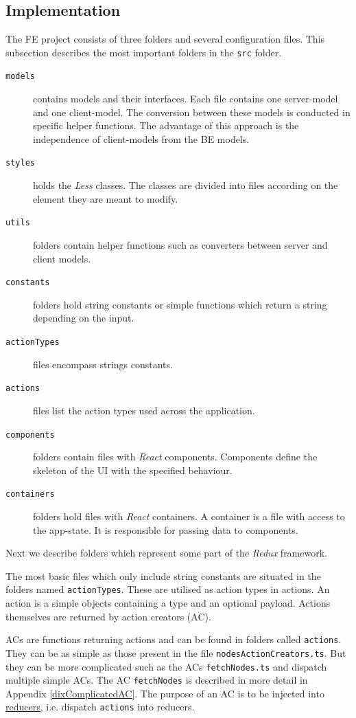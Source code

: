 \subsection{Implementation}
The FE project consists of three folders and several configuration files. This subsection describes the most important folders in the \texttt{src} folder. 
\begin{description}
    \item[\texttt{models}] contains models and their interfaces. Each file contains one server-model and one client-model. The conversion between these models is conducted in specific helper functions. The advantage of this approach is the independence of client-models from the BE models.
    \item[\texttt{styles}] holds the \textit{Less} classes. The classes are divided into files according on the element they are meant to modify.
    \item[\texttt{utils}] folders contain helper functions such as converters between server and client models.
    \item[\texttt{constants}] folders hold string constants or simple functions which return a string depending on the input. 
    \item[\texttt{actionTypes}] files encompass strings constants.
    \item[\texttt{actions}] files list the action types used across the application. 
    \item[\texttt{components}] folders contain files with \textit{React} components. Components define the skeleton of the UI with the specified behaviour.
    \item[\texttt{containers}] folders hold files with \textit{React} containers. A container is a file with access to the app-state. It is responsible for passing data to components. 
\end{description}
Next we describe folders which represent some part of the \textit{Redux} framework. 

The most basic files which only include string constants are situated in the folders named \texttt{actionTypes}.  These are utilised as action types in actions. An action is a simple objects containing a type and an optional payload. Actions themselves are returned by action creators (AC). 

ACs are functions returning actions and can be found in folders called \texttt{actions}. They can be as simple as those present in the file \texttt{nodesActionCreators.ts}. But they can be more complicated such as the ACs \texttt{fetchNodes.ts} and dispatch multiple simple ACs. The AC \texttt{fetchNodes} is described in more detail in Appendix \ref{dixComplicatedAC}. The purpose of an AC is to be injected into \hyperlink{reducers}{reducers}, i.e. dispatch \texttt{actions} into reducers. 

